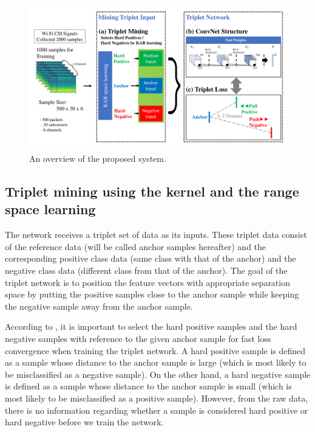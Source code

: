 \documentclass{sig-alternate-05-2015}
\begin{document}
\begin{figure}%
\centering
    \includegraphics[width=\textwidth]{fig1_tcnn_kar_v6}
    \caption{An overview of the proposed system.} \label{fig1}
\end{figure}

\subsection{Triplet mining using the kernel and the range space learning}

The network receives a triplet set of data as its inputs. These triplet data consist of the reference data (will be called anchor samples hereafter) and the corresponding positive class data (same class with that of the anchor) and the negative class data (different class from that of the anchor). The goal of the triplet network is to position the feature vectors with appropriate separation space by putting the positive samples close to the anchor sample while keeping the negative sample away from the anchor sample.

According to \cite{schroff2015facenet}, it is important to select the hard positive samples and the hard negative samples with reference to the given anchor sample for fast loss convergence when training the triplet network.
A hard positive sample is defined as a sample whose distance to the anchor sample is large (which is most likely to be misclassified as a negative sample). On the other hand, a hard negative sample is defined as a sample whose distance to the anchor sample is small (which is most likely to be misclassified as a positive sample). However, from the raw data, there is no information regarding whether a sample is considered hard positive or hard negative before we train the network.
\end{document}
